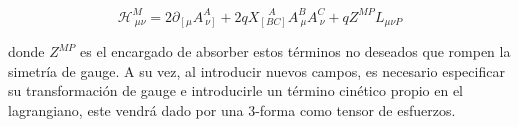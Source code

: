 \documentclass{article}
\numberwithin{equation}{section}
\begin{document}
\begin{equation}
\mathcal{H}^M_{\ \mu \nu} = 2 \partial_{\left[ \mu\right.} A^A_{\ \left. \nu \right]} + 2 q X_{\left[B C\right]}^{\ \ \ \ A} A^B_{\ \mu} A^C_{\ \nu} + q Z^{M P} L_{\mu \nu P}
\end{equation} 

donde $ Z^{M P} $ es el encargado de absorber estos términos no deseados que rompen la simetría de gauge. A su vez, al introducir nuevos campos, es necesario especificar su transformación de gauge e introducirle un término cinético propio en el lagrangiano, este vendrá dado por una 3-forma como tensor de esfuerzos.  
\end{document}
